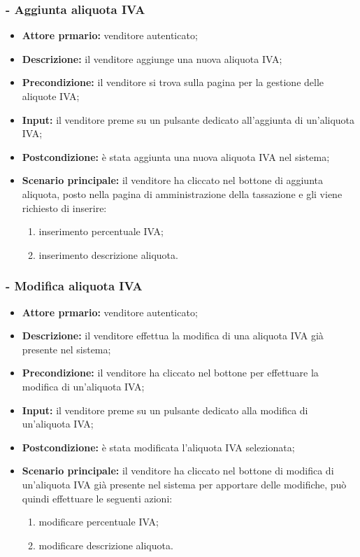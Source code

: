 \subsubsection{- Aggiunta aliquota IVA}
\begin{itemize}
    \item \textbf{Attore prmario:} venditore autenticato;
    \item \textbf{Descrizione:} il venditore aggiunge una nuova aliquota IVA;
    \item \textbf{Precondizione:} il venditore si trova sulla pagina per la gestione delle aliquote IVA;
    \item \textbf{Input:} il venditore preme su un pulsante dedicato all'aggiunta di un'aliquota IVA;
    \item \textbf{Postcondizione:} è stata aggiunta una nuova aliquota IVA nel sistema;
    \item \textbf{Scenario principale:} il venditore ha cliccato nel bottone di aggiunta aliquota, posto nella pagina di amministrazione della tassazione e gli viene richiesto di inserire:
          \begin{enumerate}
              \item inserimento percentuale IVA;
              \item inserimento descrizione aliquota.
          \end{enumerate}
\end{itemize}

\stepsubUserCase
\subsubsection{- Modifica aliquota IVA}
\begin{itemize}
    \item \textbf{Attore prmario:} venditore autenticato;
    \item \textbf{Descrizione:} il venditore effettua la modifica di una aliquota IVA già presente nel sistema;
    \item \textbf{Precondizione:} il venditore ha cliccato nel bottone per effettuare la modifica di un’aliquota IVA;
    \item \textbf{Input:} il venditore preme su un pulsante dedicato alla modifica di un'aliquota IVA;
    \item \textbf{Postcondizione:} è stata modificata l'aliquota IVA selezionata;
    \item \textbf{Scenario principale:} il venditore ha cliccato nel bottone di modifica di un’aliquota IVA già presente nel sistema per apportare delle modifiche, può quindi effettuare le seguenti azioni:
          \begin{enumerate}
              \item modificare percentuale IVA;
              \item modificare descrizione aliquota.
          \end{enumerate}
\end{itemize}

